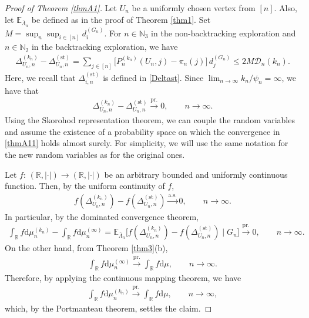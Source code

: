 \documentclass[11pt]{article}
\numberwithin{equation}{section}
\theoremstyle{plain}
\newcommand{\N}{\mathbb N}
\newcommand{\R}{\mathbb R}
\newcommand{\dd}{\mathrm{d}}
\newcommand{\prob}{\overset{\mathrm{pr.}}{\longrightarrow}}
\newcommand{\as}{\overset{\mathrm{a.s.}}{\longrightarrow}}
\newcommand{\E}{\mathbb E}
\newcommand{\Dst}{\Delta^{(\mathrm{st})}}
\begin{document}
\begin{proof}[Proof of Theorem \ref{thmA1}]
Let $U_{n}$ be a uniformly chosen vertex from $[n]$. Also, let $\E_{\bar{\Lambda}_{n}}$ be defined as in the proof of Theorem \ref{thm1}. Set $M=\sup_{n}\sup_{i\in[n]}d_{i}^{(G_{n})}$. For $n\in\N_{3}$ in the non-backtracking exploration and $n\in\N_{2}$ in the backtracking exploration, we have
\begin{align*}
\Delta_{U_n,n}^{(k_n)}-\Dst_{U_n,n} =\sum_{j \in [n]} \big[P_{n}^{(k_n)}(U_n,j)-\pi_{n}(j)\big] \,
d_{j}^{(G_{n})} \leq 2 M \mathcal{D}_{n}(k_{n}).
\end{align*}
Here, we recall that $\Dst_{i,n}$ is defined in \eqref{Deltast}. Since $\lim_{n\to\infty} k_{n}/\psi_{n}=\infty$, we have that 
\begin{align}
\label{thmA11}
\Delta_{U_n,n}^{(k_n)}-\Dst_{U_n,n}\prob 0, \qquad n\to \infty.
\end{align}
Using the Skorohod representation theorem, we can couple the random variables and assume the existence of a probability space on which the convergence in \eqref{thmA11} holds almost surely. For simplicity, we will use the same notation for the new random variables as for the original ones.

Let $f\colon\,(\R ,|\cdot|) \to (\R,|\cdot|)$ be an arbitrary bounded and uniformly continuous function. Then, by the uniform continuity of $f$, 
\begin{align*}
f(\Delta_{U_n,n}^{(k_n)})-f(\Dst_{U_n,n} )\as 0, \qquad n\to \infty.
\end{align*}
In particular, by the dominated convergence theorem,
\begin{align*}
\int_\R f\dd\mu_{n}^{(k_n)}-\int_\R f\dd\mu^{(\infty)}_{n} 
= \E_{\bar{\Lambda}_{n}}\Big[f(\Delta_{U_n,n}^{(k_n)})-f(\Dst_{U_n,n} ) \mid G_{n}\Big] \prob 0, \qquad n\to \infty.
\end{align*}
On the other hand, from Theorem \ref{thm3}(b),
\begin{align*}
\int_\R f\dd\mu^{(\infty)}_{n} \prob \int_\R f\dd\mu, \qquad n\to \infty.
\end{align*}
Therefore, by applying the continuous mapping theorem, we have
\begin{align*}
\int_\R f\dd\mu_{n}^{(k_n)}  \prob \int_\R f\dd\mu, \qquad n\to \infty,
\end{align*}
which, by the Portmanteau theorem, settles the claim.
\end{proof}
\end{document}
